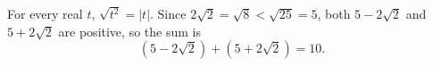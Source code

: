 For every real $t$, $\sqrt{t^2}=|t|$. Since $2\sqrt2=\sqrt8<\sqrt{25}=5$, both $5-2\sqrt2$ and $5+2\sqrt2$ are positive, so the sum is
\[\left(5-2\sqrt2\right)+\left(5+2\sqrt2\right)=\boxed{10}.\]

